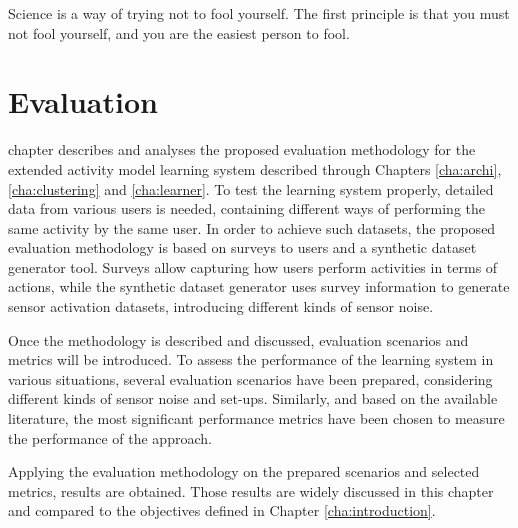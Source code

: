 

\begin{savequote}[50mm]
Science is a way of trying not to fool yourself. The first principle is that you must not fool yourself, and you are the easiest person to fool.
\end{savequote}


\chapter{Evaluation}
\label{cha:evaluation}

\ifpdf
    \graphicspath{{6_evaluation/figures/PDF/}{6_evaluation/figures/PNG/}{6_evaluation/figures/}}
\else
    \graphicspath{{6_evaluation/figures/EPS/}{6_evaluation/figures/}}
\fi

 chapter describes and analyses the proposed evaluation methodology for the extended activity model learning system described through Chapters \ref{cha:archi}, \ref{cha:clustering} and \ref{cha:learner}. To test the learning system properly, detailed data from various users is needed, containing different ways of performing the same activity by the same user. In order to achieve such datasets, the proposed evaluation methodology is based on surveys to users and a synthetic dataset generator tool. Surveys allow capturing how users perform activities in terms of actions, while the synthetic dataset generator uses survey information to generate sensor activation datasets, introducing different kinds of sensor noise. 

Once the methodology is described and discussed, evaluation scenarios and metrics will be introduced. To assess the performance of the learning system in various situations, several evaluation scenarios have been prepared, considering different kinds of sensor noise and set-ups. Similarly, and based on the available literature, the most significant performance metrics have been chosen to measure the performance of the approach.

Applying the evaluation methodology on the prepared scenarios and selected metrics, results are obtained. Those results are widely discussed in this chapter and compared to the objectives defined in Chapter \ref{cha:introduction}.

